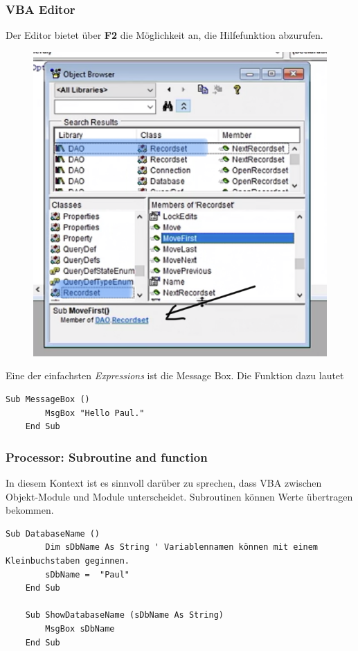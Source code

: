 \subsubsection{VBA Editor}
Der Editor bietet über \textbf{F2} die Möglichkeit an, die Hilfefunktion abzurufen.
\begin{figure}[H]
	\centering
	\includegraphics[scale = 0.3]{attachment/chapter_2/Scc021}
	\caption{}
	\label{fig:Scc021}
\end{figure} 
Eine der einfachsten \textit{Expressions} ist die Message Box. Die Funktion dazu lautet 

\begin{lstlisting}[style=VBA]
	Sub MessageBox ()
		MsgBox "Hello Paul."
	End Sub
\end{lstlisting}
\subsubsection{Processor: Subroutine and function}
In diesem Kontext ist es sinnvoll darüber zu sprechen, dass \gls{VBA} zwischen Objekt-Module und Module unterscheidet.
Subroutinen können Werte übertragen bekommen. \\

\begin{lstlisting}[style=VBA]
	Sub DatabaseName ()
		Dim sDbName As String ' Variablennamen können mit einem Kleinbuchstaben geginnen.
		sDbName =  "Paul" 
	End Sub
	
	Sub ShowDatabaseName (sDbName As String)
		MsgBox sDbName
	End Sub
\end{lstlisting}

